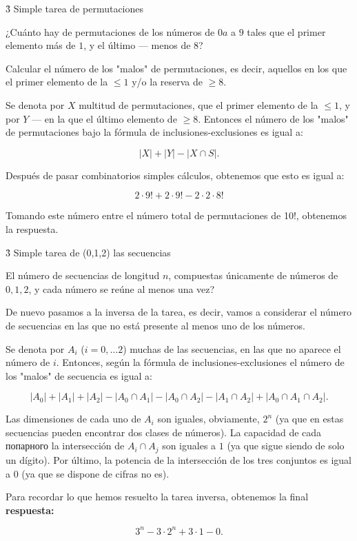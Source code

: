 \h3{ Simple tarea de permutaciones }

¿Cuánto hay de permutaciones de los números de $0 a$ a $9$ tales que el primer elemento más de $1$, y el último --- menos de $8$?

Calcular el número de los "malos" de permutaciones, es decir, aquellos en los que el primer elemento de la $\le 1$ y/o la reserva de $\ge 8$.

Se denota por $X$ multitud de permutaciones, que el primer elemento de la $\le 1$, y por $Y$ --- en la que el último elemento de $\ge 8$. Entonces el número de los "malos" de permutaciones bajo la fórmula de inclusiones-exclusiones es igual a:

$$ |X| + |Y| - |X \cap S|. $$

Después de pasar combinatorios simples cálculos, obtenemos que esto es igual a:

$$ 2 \cdot 9! + 2 \cdot 9! - 2 \cdot 2 \cdot 8! $$

Tomando este número entre el número total de permutaciones de 10$!$, obtenemos la respuesta.


\h3{ Simple tarea de (0,1,2) las secuencias }

El número de secuencias de longitud $n$, compuestas únicamente de números de $0,1,2$, y cada número se reúne al menos una vez?

De nuevo pasamos a la inversa de la tarea, es decir, vamos a considerar el número de secuencias en las que no está presente al menos uno de los números.

Se denota por $A_i$ ($i = 0, \ldots 2$) muchas de las secuencias, en las que no aparece el número de $i$. Entonces, según la fórmula de inclusiones-exclusiones el número de los "malos" de secuencia es igual a:

$$ |A_0| + |A_1| + |A_2| - |A_0 \cap A_1| - |A_0 \cap A_2| - |A_1 \cap A_2| + |A_0 \cap A_1 \cap A_2|. $$

Las dimensiones de cada uno de $A_i$ son iguales, obviamente, $2^n$ (ya que en estas secuencias pueden encontrar dos clases de números). La capacidad de cada попарного la intersección de $A_i \cap A_j$ son iguales a $1$ (ya que sigue siendo de solo un dígito). Por último, la potencia de la intersección de los tres conjuntos es igual a $0$ (ya que se dispone de cifras no es).

Para recordar lo que hemos resuelto la tarea inversa, obtenemos la final \bf{respuesta}:

$$ 3^n - 3 \cdot 2^n + 3 \cdot 1 - 0. $$


